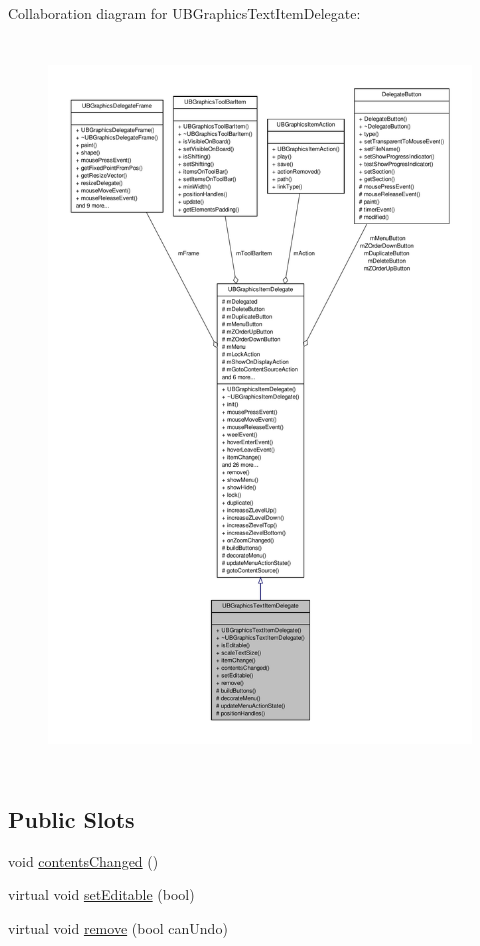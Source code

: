 Collaboration diagram for U\-B\-Graphics\-Text\-Item\-Delegate\-:
\nopagebreak
\begin{figure}[H]
\begin{center}
\leavevmode
\includegraphics[height=550pt]{d3/d1a/class_u_b_graphics_text_item_delegate__coll__graph}
\end{center}
\end{figure}
\subsection*{Public Slots}
\begin{DoxyCompactItemize}
\item 
void \hyperlink{class_u_b_graphics_text_item_delegate_a689f8e8c48294a231258478c3c61fe21}{contents\-Changed} ()
\item 
virtual void \hyperlink{class_u_b_graphics_text_item_delegate_aafb261e96f3bf4f3e732f6e69556eb43}{set\-Editable} (bool)
\item 
virtual void \hyperlink{class_u_b_graphics_text_item_delegate_a2fd28552fd6c37fad3935a44ec6b1eff}{remove} (bool can\-Undo)
\end{DoxyCompactItemize}
